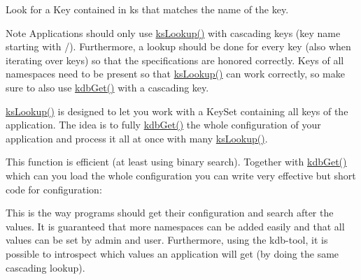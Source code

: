 Look for a Key contained in {\ttfamily ks} that matches the name of the {\ttfamily key}. 

\begin{DoxyNote}{Note}
Applications should only use \hyperlink{group__keyset_gaa34fc43a081e6b01e4120daa6c112004}{ks\+Lookup()} with cascading keys (key name starting with {\ttfamily /}). Furthermore, a lookup should be done for every key (also when iterating over keys) so that the specifications are honored correctly. Keys of all namespaces need to be present so that \hyperlink{group__keyset_gaa34fc43a081e6b01e4120daa6c112004}{ks\+Lookup()} can work correctly, so make sure to also use \hyperlink{group__kdb_ga28e385fd9cb7ccfe0b2f1ed2f62453a1}{kdb\+Get()} with a cascading key.
\end{DoxyNote}
{\ttfamily \hyperlink{group__keyset_gaa34fc43a081e6b01e4120daa6c112004}{ks\+Lookup()}} is designed to let you work with a Key\+Set containing all keys of the application. The idea is to fully \hyperlink{group__kdb_ga28e385fd9cb7ccfe0b2f1ed2f62453a1}{kdb\+Get()} the whole configuration of your application and process it all at once with many {\ttfamily \hyperlink{group__keyset_gaa34fc43a081e6b01e4120daa6c112004}{ks\+Lookup()}}.

This function is efficient (at least using binary search). Together with \hyperlink{group__kdb_ga28e385fd9cb7ccfe0b2f1ed2f62453a1}{kdb\+Get()} which can you load the whole configuration you can write very effective but short code for configuration\+:


 This is the way programs should get their configuration and search after the values. It is guaranteed that more namespaces can be added easily and that all values can be set by admin and user. Furthermore, using the kdb-\/tool, it is possible to introspect which values an application will get (by doing the same cascading lookup).

